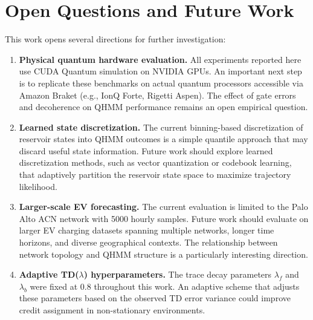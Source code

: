 
\section{Open Questions and Future Work}


This work opens several directions for further investigation:


\begin{enumerate}
  \item \textbf{Physical quantum hardware evaluation.} All experiments
    reported here use CUDA Quantum simulation on NVIDIA GPUs. An important
    next step is to replicate these benchmarks on actual quantum processors
    accessible via Amazon Braket (e.g., IonQ Forte, Rigetti Aspen). The
    effect of gate errors and decoherence on QHMM performance remains
    an open empirical question.


  \item \textbf{Learned state discretization.} The current binning-based
    discretization of reservoir states into QHMM outcomes is a simple
    quantile approach that may discard useful state information. Future
    work should explore learned discretization methods, such as vector
    quantization or codebook learning, that adaptively partition the
    reservoir state space to maximize trajectory likelihood.


  \item \textbf{Larger-scale EV forecasting.} The current evaluation
    is limited to the Palo Alto ACN network with 5000 hourly samples.
    Future work should evaluate on larger EV charging datasets spanning
    multiple networks, longer time horizons, and diverse geographical
    contexts. The relationship between network topology and QHMM structure
    is a particularly interesting direction.


  \item \textbf{Adaptive TD($\lambda$) hyperparameters.} The trace decay
    parameters $\lambda_f$ and $\lambda_b$ were fixed at 0.8 throughout
    this work. An adaptive scheme that adjusts these parameters based on
    the observed TD error variance could improve credit assignment in
    non-stationary environments.


\end{enumerate}
